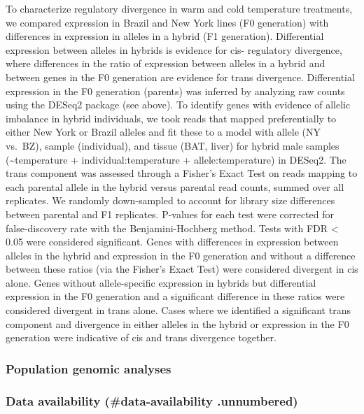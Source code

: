 \documentclass[9pt,twocolumn,twoside,lineno]{pnas-new}
\begin{document}
To characterize regulatory divergence in warm and cold temperature
treatments, we compared expression in Brazil and New York lines (F0
generation) with differences in expression in alleles in a hybrid (F1
generation). Differential expression between alleles in hybrids is
evidence for cis- regulatory divergence, where differences in the ratio
of expression between alleles in a hybrid and between genes in the F0
generation are evidence for trans divergence. Differential expression in
the F0 generation (parents) was inferred by analyzing raw counts using
the DESeq2 package (see above). To identify genes with evidence of
allelic imbalance in hybrid individuals, we took reads that mapped
preferentially to either New York or Brazil alleles and fit these to a
model with allele (NY vs.~BZ), sample (individual), and tissue (BAT,
liver) for hybrid male samples (\textasciitilde temperature +
individual:temperature + allele:temperature) in DESeq2. The trans
component was assessed through a Fisher's Exact Test on reads mapping to
each parental allele in the hybrid versus parental read counts, summed
over all replicates. We randomly down-sampled to account for library
size differences between parental and F1 replicates. P-values for each
test were corrected for false-discovery rate with the Benjamini-Hochberg
method. Tests with FDR \textless{} 0.05 were considered significant.
Genes with differences in expression between alleles in the hybrid and
expression in the F0 generation and without a difference between these
ratios (via the Fisher's Exact Test) were considered divergent in cis
alone. Genes without allele-specific expression in hybrids but
differential expression in the F0 generation and a significant
difference in these ratios were considered divergent in trans alone.
Cases where we identified a significant trans component and divergence
in either alleles in the hybrid or expression in the F0 generation were
indicative of cis and trans divergence together.

\hypertarget{population-genomic-analyses}{%
\subsubsection*{Population genomic
analyses}\label{population-genomic-analyses}}

\hypertarget{data-availability-data-availability-.unnumbered}{%
\subsubsection{Data availability (\#data-availability
.unnumbered)}\label{data-availability-data-availability-.unnumbered}}
\end{document}
